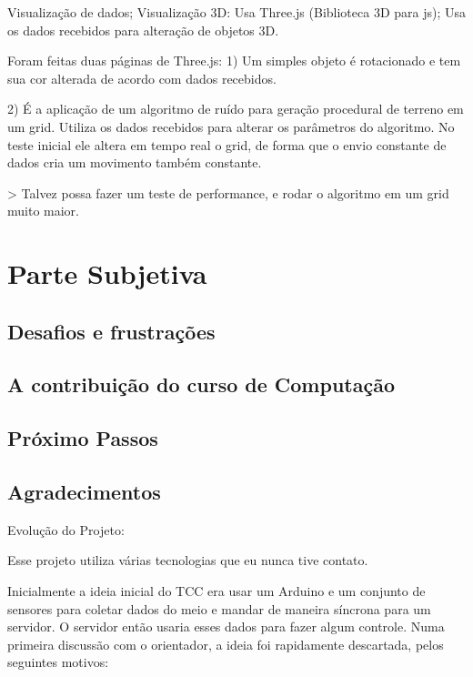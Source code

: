\documentclass[a4paper,12pt]{article}
\begin{document}
  Visualização de dados;
    Visualização 3D:
      Usa Three.js (Biblioteca 3D para js);
      Usa os dados recebidos para alteração de objetos 3D.


      Foram feitas duas páginas de Three.js:
        1) Um simples objeto é rotacionado e tem sua cor alterada de acordo com dados recebidos.


        2) É a aplicação de um algoritmo de ruído para geração procedural de terreno em um grid. Utiliza os dados recebidos para alterar os parâmetros do algoritmo.
          No teste inicial ele altera em tempo real o grid, de forma que o envio constante de dados cria um movimento também constante.


          > Talvez possa fazer um teste de performance, e rodar o algoritmo em um grid muito maior.







\section{Parte Subjetiva}


\subsection{Desafios e frustrações}
\subsection{A contribuição do curso de Computação}
\subsection{Próximo Passos}
\subsection{Agradecimentos}



Evolução do Projeto:


Esse projeto utiliza várias tecnologias que eu nunca tive contato.


Inicialmente a ideia inicial do TCC era usar um Arduino e um conjunto de sensores para coletar dados do meio e mandar de maneira síncrona para um servidor. O servidor então usaria esses dados para fazer algum controle. Numa primeira discussão com o orientador, a ideia foi rapidamente descartada, pelos seguintes motivos:
\end{document}

